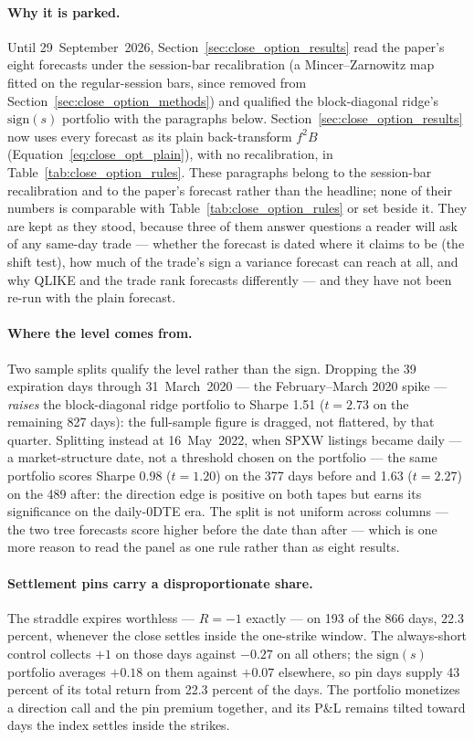 \paragraph{Why it is parked.} Until 29~September~2026, Section~\ref{sec:close_option_results}
read the paper's eight forecasts under the session-bar recalibration (a Mincer--Zarnowitz
map fitted on the regular-session bars, since removed from
Section~\ref{sec:close_option_methods}) and qualified the block-diagonal ridge's
$\mathrm{sign}(s)$ portfolio with the paragraphs below. Section~\ref{sec:close_option_results}
now uses every forecast as its plain back-transform $f^{2}B$
(Equation~\eqref{eq:close_opt_plain}), with no recalibration, in
Table~\ref{tab:close_option_rules}. These paragraphs belong to the session-bar recalibration and
to the paper's forecast rather than the headline; none of their numbers is comparable with
Table~\ref{tab:close_option_rules} or set beside it. They are kept as they stood, because
three of them answer questions a reader will ask of any same-day trade --- whether the
forecast is dated where it claims to be (the shift test), how much of the trade's sign a
variance forecast can reach at all, and why QLIKE and the trade rank forecasts differently
--- and they have not been re-run with the plain forecast.

\paragraph{Where the level comes from.} Two sample splits qualify the
level rather than the sign. Dropping the 39 expiration days through
31~March~2020 --- the February--March 2020 spike --- \emph{raises} the
block-diagonal ridge portfolio to Sharpe 1.51 ($t=2.73$ on the
remaining 827 days): the full-sample figure is dragged, not
flattered, by that quarter. Splitting instead at
16~May~2022, when SPXW listings became daily --- a market-structure date, not a
threshold chosen on the portfolio --- the same portfolio scores Sharpe 0.98
($t=1.20$) on the 377 days before and 1.63 ($t=2.27$) on the
489 after: the direction edge is positive on both tapes but earns its
significance on the daily-0DTE era. The split is not uniform across columns
--- the two tree forecasts score higher before the date than after --- which is
one more reason to read the panel as one rule rather than as eight results.

\paragraph{Settlement pins carry a disproportionate share.} The
straddle expires worthless --- $R=-1$ exactly --- on 193 of the 866
days, 22.3 percent, whenever the close settles inside the one-strike
window. The always-short control collects $+1$ on those days against
$-0.27$ on all others; the $\mathrm{sign}(s)$ portfolio averages
$+0.18$ on them against $+0.07$ elsewhere, so pin days supply
43 percent of its total return from 22.3 percent of the
days. The portfolio monetizes a direction
call and the pin premium together, and its P\&L remains tilted toward
days the index settles inside the strikes.

